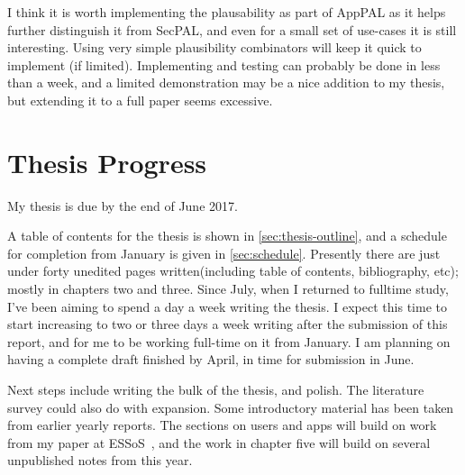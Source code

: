 \documentclass[a4paper]{scrartcl}
\begin{document}
I think it is worth implementing the plausability as part of AppPAL as it helps
further distinguish it from SecPAL, and even for a small set of use-cases it is
still interesting.  Using very simple plausibility combinators will keep it
quick to implement (if limited).  Implementing and testing can probably be done
in less than a week, and a limited demonstration may be a nice addition to my
thesis, but extending it to a full paper seems excessive.

\section{Thesis Progress}
\label{sec:thesis}

My thesis is due by the end of June 2017.

A table of contents for the thesis is shown in \autoref{sec:thesis-outline}, and
a schedule for completion from January is given in \autoref{sec:schedule}.
Presently there are just under forty unedited pages written(including table of
contents, bibliography, etc); mostly in chapters two and three. Since July, when
I returned to fulltime study, I've been aiming to spend a day a week writing the
thesis. I expect this time to start increasing to two or three days a week
writing after the submission of this report, and for me to be working full-time
on it from January. I am planning on having a complete draft finished by April,
in time for submission in June.


Next steps include writing the bulk of the thesis, and polish.  The literature
survey could also do with expansion.  Some introductory material has been
taken from earlier yearly reports.  The sections on users and apps will build on
work from my paper at ESSoS~\cite{hallett_apppal_2016}, and the work in chapter
five will build on several unpublished notes from this year.
\end{document}
